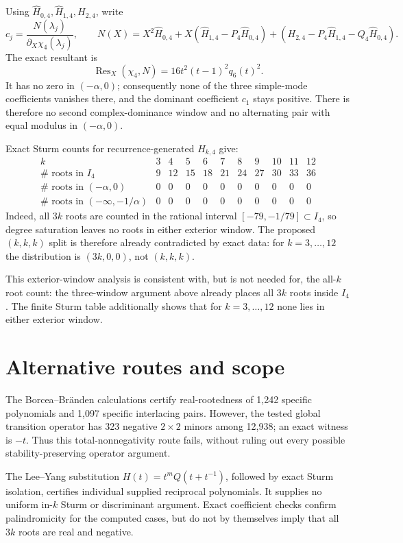 \documentclass[11pt]{article}
\begin{document}
Using $\widehat H_{0,4},\widehat H_{1,4},H_{2,4}$, write
\[
 c_j=\frac{N(\lambda_j)}{\partial_X\chi_4(\lambda_j)},\qquad
 N(X)=X^2\widehat H_{0,4}
       +X(\widehat H_{1,4}-P_4\widehat H_{0,4})
       +(H_{2,4}-P_4\widehat H_{1,4}-Q_4\widehat H_{0,4}).
\]
The exact resultant is
\[
 \operatorname{Res}_X(\chi_4,N)
   =16t^2(t-1)^2q_6(t)^2.
\]
It has no zero in $(-\alpha,0)$; consequently none of the three
simple-mode coefficients vanishes there, and the dominant coefficient
$c_1$ stays positive. There is therefore no second complex-dominance
window and no alternating pair with equal modulus in $(-\alpha,0)$.

Exact Sturm counts for recurrence-generated $H_{k,4}$ give:
\[
\begin{array}{c|rrrrrrrrrr}
k&3&4&5&6&7&8&9&10&11&12\\ \hline
\#\text{ roots in }I_4&9&12&15&18&21&24&27&30&33&36\\
\#\text{ roots in }(-\alpha,0)&0&0&0&0&0&0&0&0&0&0\\
\#\text{ roots in }(-\infty,-1/\alpha)&0&0&0&0&0&0&0&0&0&0
\end{array}
\]
Indeed, all $3k$ roots are counted in the rational interval
$[-79,-1/79]\subset I_4$, so degree saturation leaves no roots in
either exterior window. The proposed $(k,k,k)$ split is therefore
already contradicted by exact data: for $k=3,\ldots,12$ the distribution
is $(3k,0,0)$, not $(k,k,k)$.

This exterior-window analysis is consistent with, but is not needed for,
the all-$k$ root count: the three-window argument above already places
all $3k$ roots inside $I_4$. The finite Sturm table additionally shows
that for $k=3,\ldots,12$ none lies in either exterior window.

\section{Alternative routes and scope}
The Borcea--Br\"anden calculations certify real-rootedness of 1,242
specific polynomials and 1,097 specific interlacing pairs. However, the
tested global transition operator has 323 negative $2\times2$ minors
among 12,938; an exact witness is $-t$. Thus this total-nonnegativity
route fails, without ruling out every possible stability-preserving
operator argument.

The Lee--Yang substitution
$H(t)=t^mQ(t+t^{-1})$, followed by exact Sturm isolation, certifies
individual supplied reciprocal polynomials. It supplies no uniform
in-$k$ Sturm or discriminant argument. Exact coefficient checks confirm
palindromicity for the computed cases, but do not by themselves imply
that all $3k$ roots are real and negative.
\end{document}

